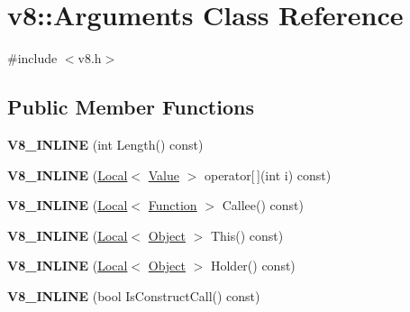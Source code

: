 \hypertarget{classv8_1_1_arguments}{}\section{v8\+:\+:Arguments Class Reference}
\label{classv8_1_1_arguments}


{\ttfamily \#include $<$v8.\+h$>$}

\subsection*{Public Member Functions}
\begin{DoxyCompactItemize}
\item 
\hypertarget{classv8_1_1_arguments_a413f88a76df634b62868fd363ed47adf}{}{\bfseries V8\+\_\+\+I\+N\+L\+I\+N\+E} (int Length() const)\label{classv8_1_1_arguments_a413f88a76df634b62868fd363ed47adf}

\item 
\hypertarget{classv8_1_1_arguments_a08633a096afc5e36e173aaa4d7bb4103}{}{\bfseries V8\+\_\+\+I\+N\+L\+I\+N\+E} (\hyperlink{classv8_1_1_local}{Local}$<$ \hyperlink{classv8_1_1_value}{Value} $>$ operator\mbox{[}$\,$\mbox{]}(int i) const)\label{classv8_1_1_arguments_a08633a096afc5e36e173aaa4d7bb4103}

\item 
\hypertarget{classv8_1_1_arguments_acbd13d4ea13055c4b905942831820f42}{}{\bfseries V8\+\_\+\+I\+N\+L\+I\+N\+E} (\hyperlink{classv8_1_1_local}{Local}$<$ \hyperlink{classv8_1_1_function}{Function} $>$ Callee() const)\label{classv8_1_1_arguments_acbd13d4ea13055c4b905942831820f42}

\item 
\hypertarget{classv8_1_1_arguments_a5ce7e4e803e69e6558add72b83a4818d}{}{\bfseries V8\+\_\+\+I\+N\+L\+I\+N\+E} (\hyperlink{classv8_1_1_local}{Local}$<$ \hyperlink{classv8_1_1_object}{Object} $>$ This() const)\label{classv8_1_1_arguments_a5ce7e4e803e69e6558add72b83a4818d}

\item 
\hypertarget{classv8_1_1_arguments_a2a57abac41f589aeca16129c4c8213b9}{}{\bfseries V8\+\_\+\+I\+N\+L\+I\+N\+E} (\hyperlink{classv8_1_1_local}{Local}$<$ \hyperlink{classv8_1_1_object}{Object} $>$ Holder() const)\label{classv8_1_1_arguments_a2a57abac41f589aeca16129c4c8213b9}

\item 
\hypertarget{classv8_1_1_arguments_a17e0103b2bf5f1b7aa075f2b56e3c65b}{}{\bfseries V8\+\_\+\+I\+N\+L\+I\+N\+E} (bool Is\+Construct\+Call() const)\label{classv8_1_1_arguments_a17e0103b2bf5f1b7aa075f2b56e3c65b}


\end{DoxyCompactItemize}

